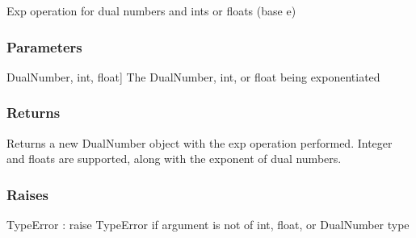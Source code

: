 \documentclass[letterpaper,10pt,english]{sphinxmanual}
\begin{document}
\begin{fulllineitems}
\label{\detokenize{autodiff:autodiff.operators.exp}}
\pysigstartsignatures
{}
\pysigstopsignatures
\sphinxAtStartPar
Exp operation for dual numbers and ints or floats (base e)


\subsubsection{Parameters}
\label{\detokenize{autodiff:id21}}\begin{description}
\sphinxlineitem{x}{[}DualNumber, int, float{]}
\sphinxAtStartPar
The DualNumber, int, or float being exponentiated

\end{description}


\subsubsection{Returns}
\label{\detokenize{autodiff:id22}}\begin{description}
\sphinxAtStartPar
Returns a new DualNumber object with the exp operation performed. Integer and
floats are supported, along with the exponent of dual numbers.

\end{description}


\subsubsection{Raises}
\label{\detokenize{autodiff:id23}}
\sphinxAtStartPar
TypeError : raise TypeError if argument is not of int, float, or DualNumber type

\end{fulllineitems}

\end{document}
